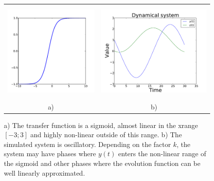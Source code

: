 \documentclass[10pt,oneside]{scrartcl}
\begin{document}
\begin{figure}
\begin{center}
\begin{tabular}{cc}
\includegraphics[height=5cm]{Examples/EKF-Ex/plot_sigmoid.pdf} &
\includegraphics[height=5cm]{Examples/EKF-Ex/simulation_ex1.pdf}\\
a) & b)
\end{tabular}
\end{center}
\caption{\label{fig:ekf_ex1_simu} a) The transfer function is a sigmoid,
  almost linear in the xrange $[-3;3]$ and highly non-linear outside
  of this range. b) The simulated system is oscillatory. Depending on
  the factor $k$, the system may have phases where $y(t)$ enters the
  non-linear range of the sigmoid and other phases where the evolution
  function can be well linearly approximated.}
\end{figure}
\end{document}
